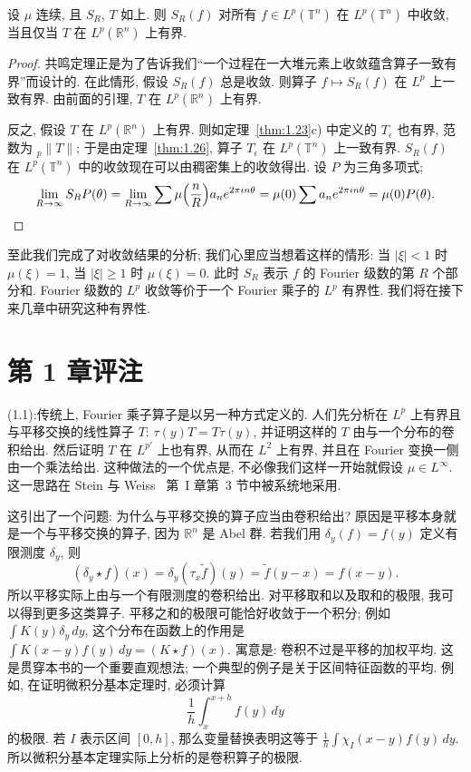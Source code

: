 \begin{theorem}\label{thm:1.29}
设 $\mu$ 连续, 且 $S_R$, $T$ 如上. 则 $S_R(f)$ 对所有 $f\in L^p(\mathbb{T}^n)$ 在 $L^p(\mathbb{T}^n)$ 中收敛, 当且仅当 $T$ 在 $L^p(\mathbb{R}^n)$ 上有界.
\end{theorem}

\begin{proof}
共鸣定理正是为了告诉我们``一个过程在一大堆元素上收敛蕴含算子一致有界''而设计的. 在此情形, 假设 $S_R(f)$ 总是收敛. 则算子 $f\mapsto S_R(f)$ 在 $L^p$ 上一致有界. 由前面的引理, $T$ 在 $L^p(\mathbb{R}^n)$ 上有界.

反之, 假设 $T$ 在 $L^p(\mathbb{R}^n)$ 上有界. 则如定理~\ref{thm:1.23}c) 中定义的 $T_{\epsilon}$ 也有界, 范数为 ${}_p\|T\|$; 于是由定理~\ref{thm:1.26}, 算子 $T_{\epsilon}$ 在 $L^p(\mathbb{T}^n)$ 上一致有界. $S_R(f)$ 在 $L^p(\mathbb{T}^n)$ 中的收敛现在可以由稠密集上的收敛得出. 设 $P$ 为三角多项式;
\[
\lim_{R\to\infty}S_RP(\theta)=\lim_{R\to\infty}\sum\mu\Bigl(\frac{n}{R}\Bigr)a_ne^{2\pi in\theta}
=\mu(0)\sum a_ne^{2\pi in\theta}=\mu(0)P(\theta). \qedhere
\]
\end{proof}

\begin{remark}\label{rem:1.30}
至此我们完成了对收敛结果的分析; 我们心里应当想着这样的情形: 当 $|\xi|<1$ 时 $\mu(\xi)=1$, 当 $|\xi|\geq 1$ 时 $\mu(\xi)=0$. 此时 $S_R$ 表示 $f$ 的 Fourier 级数的第 $R$ 个部分和. Fourier 级数的 $L^p$ 收敛等价于一个 Fourier 乘子的 $L^p$ 有界性. 我们将在接下来几章中研究这种有界性.
\end{remark}

\section{第 1 章评注}
\label{sec:1.4}

\noindent (1.1):\quad 传统上, Fourier 乘子算子是以另一种方式定义的. 人们先分析在 $L^p$ 上有界且与平移交换的线性算子 $T$: $\tau(y)T=T\tau(y)$, 并证明这样的 $T$ 由与一个分布的卷积给出. 然后证明 $T$ 在 $L^{p'}$ 上也有界, 从而在 $L^2$ 上有界, 并且在 Fourier 变换一侧由一个乘法给出. 这种做法的一个优点是, 不必像我们这样一开始就假设 $\mu\in L^{\infty}$. 这一思路在 Stein 与 Weiss~\cite{steinweiss} 第~I 章第~3 节中被系统地采用.

这引出了一个问题: 为什么与平移交换的算子应当由卷积给出? 原因是平移本身就是一个与平移交换的算子, 因为 $\mathbb{R}^n$ 是 Abel 群. 若我们用 $\delta_y(f)=f(y)$ 定义有限测度 $\delta_y$, 则
\[
(\delta_y\star f)(x)=\delta_y(\tau_x\tilde{f})(y)=\tilde{f}(y-x)=f(x-y).
\]
所以平移实际上由与一个有限测度的卷积给出. 对平移取和以及取和的极限, 我可以得到更多这类算子. 平移之和的极限可能恰好收敛于一个积分; 例如 $\int K(y)\delta_y\,dy$, 这个分布在函数上的作用是 $\int K(x-y)f(y)\,dy=(K\star f)(x)$. 寓意是: 卷积不过是平移的加权平均. 这是贯穿本书的一个重要直观想法; 一个典型的例子是关于区间特征函数的平均. 例如, 在证明微积分基本定理时, 必须计算
\[
\frac{1}{h}\int_x^{x+h}f(y)\,dy
\]
的极限. 若 $I$ 表示区间 $[0,h]$, 那么变量替换表明这等于 $\frac{1}{h}\int\chi_I(x-y)f(y)\,dy$. 所以微积分基本定理实际上分析的是卷积算子的极限.

